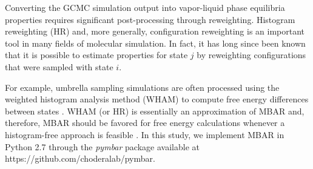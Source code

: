 \documentclass[journal=jced,manuscript=article]{achemso}
\begin{document}
%




Converting the GCMC simulation output into vapor-liquid phase equilibria properties requires significant post-processing through reweighting. Histogram reweighting (HR) and, more generally, configuration reweighting is an important tool in many fields of molecular simulation.\cite{Ferrenberg1988,Ferrenberg1989} In fact, it has long since been known that it is possible to estimate properties for state $j$ by reweighting configurations that were sampled with state $i$. \cite{McDonald1967,Card1970,Wood1968,Pana2000} 

For example, umbrella sampling simulations are often processed using the weighted histogram analysis method (WHAM) to compute free energy differences between states \cite{Kumar1992}. WHAM (or HR) is essentially an approximation of MBAR and, therefore, MBAR should be favored for free energy calculations whenever a histogram-free approach is feasible \cite{Souaille2001,Matos2017}. In this study, we implement MBAR in Python 2.7 through the \textit{pymbar} package available at https://github.com/choderalab/pymbar. 
\end{document}
